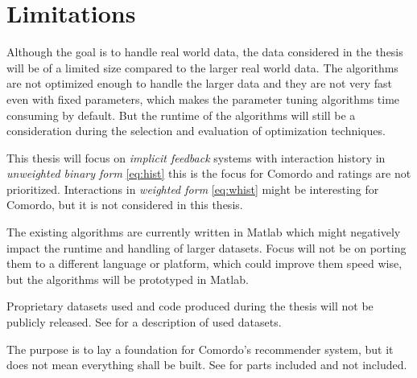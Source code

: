 
\section{Limitations}\label{sec:intro:limitations}

Although the goal is to handle real world data, the data considered in the thesis will be of a limited size compared to the larger real world data. The algorithms are not optimized enough to handle the larger data and they are not very fast even with fixed parameters, which makes the parameter tuning algorithms time consuming by default. But the runtime of the algorithms will still be a consideration during the selection and evaluation of optimization techniques.

This thesis will focus on \textit{implicit feedback} systems with interaction history in \textit{unweighted binary form} \eqref{eq:hist} this is the focus for Comordo and ratings are not prioritized. Interactions in \textit{weighted form} \eqref{eq:whist} might be interesting for Comordo, but it is not considered in this thesis.

The existing algorithms are currently written in Matlab which might negatively impact the runtime and handling of larger datasets. Focus will not be on porting them to a different language or platform, which could improve them speed wise, but the algorithms will be prototyped in Matlab.

Proprietary datasets used and code produced during the thesis will not be publicly released. See  for a description of used datasets.

The purpose is to lay a foundation for Comordo's recommender system, but it does not mean everything shall be built. See  for parts included and not included.

